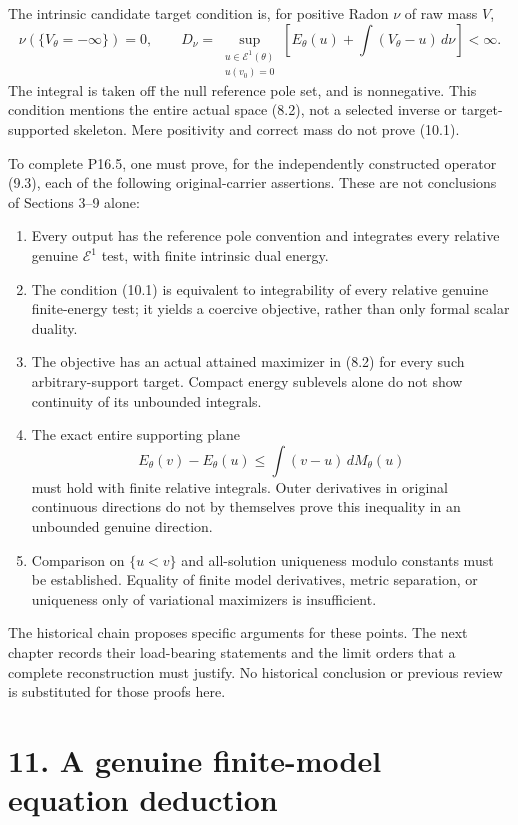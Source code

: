 \documentclass[
  10pt,
]{article}
\providecommand{\tightlist}{%
  \setlength{\itemsep}{0pt}\setlength{\parskip}{0pt}}
\begin{document}
The intrinsic candidate target condition is, for positive Radon \(\nu\)
of raw mass \(V\), \[\nu(\{V_\theta=-\infty\})=0,\qquad
D_\nu=\sup_{\substack{u\in\mathcal E^1(\theta)\\u(v_0)=0}}
\left[E_\theta(u)+\int(V_\theta-u)\,d\nu\right]<\infty.\tag{10.1}\] The
integral is taken off the null reference pole set, and is nonnegative.
This condition mentions the entire actual space (8.2), not a selected
inverse or target-supported skeleton. Mere positivity and correct mass
do not prove (10.1).

To complete P16.5, one must prove, for the independently constructed
operator (9.3), each of the following original-carrier assertions. These
are not conclusions of Sections 3--9 alone:

\begin{enumerate}
\def\labelenumi{\arabic{enumi}.}
\tightlist
\item
  Every output has the reference pole convention and integrates every
  relative genuine \(\mathcal E^1\) test, with finite intrinsic dual
  energy.
\item
  The condition (10.1) is equivalent to integrability of every relative
  genuine finite-energy test; it yields a coercive objective, rather
  than only formal scalar duality.
\item
  The objective has an actual attained maximizer in (8.2) for every such
  arbitrary-support target. Compact energy sublevels alone do not show
  continuity of its unbounded integrals.
\item
  The exact entire supporting plane
  \[E_\theta(v)-E_\theta(u)\leq\int(v-u)\,dM_\theta(u)\] must hold with
  finite relative integrals. Outer derivatives in original continuous
  directions do not by themselves prove this inequality in an unbounded
  genuine direction.
\item
  Comparison on \(\{u<v\}\) and all-solution uniqueness modulo constants
  must be established. Equality of finite model derivatives, metric
  separation, or uniqueness only of variational maximizers is
  insufficient.
\end{enumerate}

The historical chain proposes specific arguments for these points. The
next chapter records their load-bearing statements and the limit orders
that a complete reconstruction must justify. No historical conclusion or
previous review is substituted for those proofs here.

\section{11. A genuine finite-model equation
deduction}\label{a-genuine-finite-model-equation-deduction}
\end{document}
